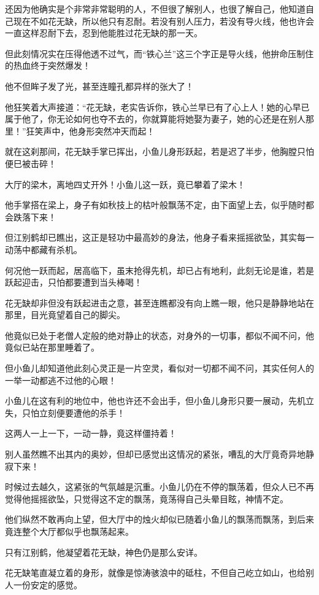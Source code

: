 \documentclass[12pt,oneside]{book}
\begin{document}
还因为他确实是个非常非常聪明的人，不但很了解别人，也很了解自己，他知道自己现在不如花无缺，所以他只有忍耐。若没有别人压力，若没有导火线，他也许会一直这样忍耐下去，忍到他能胜过花无缺的那一天。

但此刻情况实在压得他透不过气，而``铁心兰''这三个字正是导火线，他拚命压制住的热血终于突然爆发！

他不但眸子发了光，甚至连瞳孔都异样的张大了！

他狂笑着大声接道：``花无缺，老实告诉你，铁心兰早已有了心上人！她的心早已属于他了，你无论如何也夺不去的，你就算能将她娶为妻子，她的心还是在别人那里！''狂笑声中，他身形突然冲天而起！

就在这刹那间，花无缺手掌已挥出，小鱼儿身形跃起，若是迟了半步，他胸膛只怕便巳被击碎！

大厅的梁木，离地四丈开外！小鱼儿这一跃，竟已攀着了梁木！

他手掌搭在梁上，身子有如秋技上的枯叶般飘荡不定，由下面望上去，似乎随时都会跌落下来！

但江别鹤却已瞧出，这正是轻功中最高妙的身法，他身子看来摇摇欲坠，其实每一动荡中都藏有杀机。

何况他一跃而起，居高临下，虽末抢得先机，却已占有地利，此刻无论是谁，若是跃起迎击，只怕都要遭到当头棒喝！

花无缺却非但没有跃起进击之意，甚至连瞧都没有向上瞧一眼，他只是静静地站在那里，目光竟望着自己的脚尖。

他竟似已处于老僧人定般的绝对静止的状态，对身外的一切事，都似不闻不问，他竟似已站在那里睡着了。

但小鱼儿却知道他此刻心灵正是一片空灵，看似对一切都不闻不问，其实任何人的一举一动都逃不过他的心眼！

小鱼儿在这有利的地位中，他也许还不会出手，但小鱼儿身形只要一展动，先机立失，只怕立刻便要遭他的杀手！

这两人一上一下，一动一静，竟这样僵持着！

别人虽然瞧不出其内的奥妙，但却已感觉出这情况的紧张，嘈乱的大厅竟奇异地静寂下来！

时候过去越久，这紧张的气氛越是沉重。小鱼儿仍在不停的飘荡着，但众人已不再觉得他摇摇欲坠，只觉得这不定的飘荡，竟荡得自己头晕目眩，神情不定。

他们纵然不敢再向上望，但大厅中的烛火却似已随着小鱼儿的飘荡而飘荡，到后来竟连整个大厅都似乎也飘荡起来。

只有江别鹤，他凝望着花无缺，神色仍是那么安详。

花无缺笔直凝立着的身形，就像是惊涛骇浪中的砥柱，不但自己屹立如山，也给别人一份安定的感觉。
\end{document}
